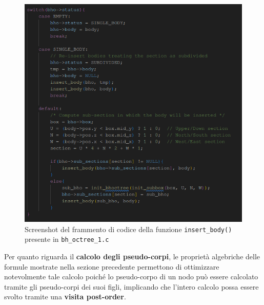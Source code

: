 \documentclass[12pt]{report}
\begin{document}
    \begin{figure}[H]
        \centering
        \includegraphics[width=\textwidth]{images/insert.png}
        \caption{Screenshot del frammento di codice della funzione \texttt{insert\_body()} presente in \texttt{bh\_octree\_1.c}}
        \label{fig:insert}
    \end{figure}
    
    \newpage

    Per quanto riguarda il \textbf{calcolo degli pseudo-corpi}, le proprietà algebriche delle formule mostrate nella sezione precedente permettono di ottimizzare notevolmente tale calcolo poiché lo pseudo-corpo di un nodo può essere calcolato tramite gli pseudo-corpi dei suoi figli, implicando che l'intero calcolo possa essere svolto tramite una \textbf{visita post-order}.
\end{document}
